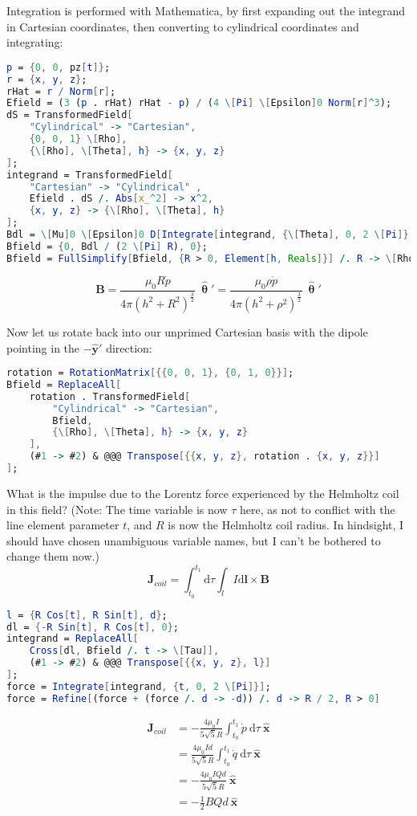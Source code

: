 \documentclass[a4paper]{scrartcl}
\begin{document}
Integration is performed with Mathematica, by first expanding out the integrand in Cartesian coordinates, then converting to cylindrical coordinates and integrating:
\begin{lstlisting}[language = Mathematica, frame = single]
p = {0, 0, pz[t]};
r = {x, y, z};
rHat = r / Norm[r];
Efield = (3 (p . rHat) rHat - p) / (4 \[Pi] \[Epsilon]0 Norm[r]^3);
dS = TransformedField[
    "Cylindrical" -> "Cartesian",
    {0, 0, 1} \[Rho],
    {\[Rho], \[Theta], h} -> {x, y, z}
];
integrand = TransformedField[
    "Cartesian" -> "Cylindrical" ,
    Efield . dS /. Abs[x_^2] -> x^2,
    {x, y, z} -> {\[Rho], \[Theta], h}
];
Bdl = \[Mu]0 \[Epsilon]0 D[Integrate[integrand, {\[Theta], 0, 2 \[Pi]}, {\[Rho], 0, R}], t];
Bfield = {0, Bdl / (2 \[Pi] R), 0};
Bfield = FullSimplify[Bfield, {R > 0, Element[h, Reals]}] /. R -> \[Rho];
\end{lstlisting}
\[\mathbf{B} = \frac{\mu_0 R \dot{p}}{4 \pi \left(h^2 + R^2\right)^\frac{3}{2}} \:\hat{\boldsymbol{\uptheta}}' = \frac{\mu_0 \rho \dot{p}}{4 \pi \left(h^2 + \rho^2\right)^\frac{3}{2}} \:\hat{\boldsymbol{\uptheta}}'\]

Now let us rotate back into our unprimed Cartesian basis with the dipole pointing in the \(-\hat{\mathbf{y}}'\) direction:
\begin{lstlisting}[language = Mathematica, frame = single]
rotation = RotationMatrix[{{0, 0, 1}, {0, 1, 0}}];
Bfield = ReplaceAll[
    rotation . TransformedField[
        "Cylindrical" -> "Cartesian",
        Bfield,
        {\[Rho], \[Theta], h} -> {x, y, z}
    ],
    (#1 -> #2) & @@@ Transpose[{{x, y, z}, rotation . {x, y, z}}]
];
\end{lstlisting}

What is the impulse due to the Lorentz force experienced by the Helmholtz coil in this field? (Note: The time variable is now \(\tau\) here, as not to conflict with the line element parameter \(t\), and \(R\) is now the Helmholtz coil radius. In hindsight, I should have chosen unambiguous variable names, but I can't be bothered to change them now.)
\[\mathbf{J}_{coil} = \int_{t_0}^{t_1} \mathrm{d}\tau \int_l I \mathrm{d}\mathbf{l} \times \mathbf{B}\]
\begin{lstlisting}[language = Mathematica, frame = single]
l = {R Cos[t], R Sin[t], d};
dl = {-R Sin[t], R Cos[t], 0};
integrand = ReplaceAll[
    Cross[dl, Bfield /. t -> \[Tau]],
    (#1 -> #2) & @@@ Transpose[{{x, y, z}, l}]
];
force = Integrate[integrand, {t, 0, 2 \[Pi]}];
force = Refine[(force + (force /. d -> -d)) /. d -> R / 2, R > 0]
\end{lstlisting}
\begin{align*}
    \mathbf{J}_{coil} &= -\frac{4 \mu_0 I}{5 \sqrt{5} R} \int_{t_0}^{t_1} \dot{p} \:\mathrm{d}\tau \:\hat{\mathbf{x}} \\
    &= \frac{4 \mu_0 I d}{5 \sqrt{5} R} \int_{t_0}^{t_1} \dot{q} \:\mathrm{d}\tau \:\hat{\mathbf{x}} \\
    &= -\frac{4 \mu_0 I Q d}{5 \sqrt{5} R} \:\hat{\mathbf{x}} \\
    &= -\frac{1}{2} B Q d \:\hat{\mathbf{x}}
\end{align*}
\end{document}
